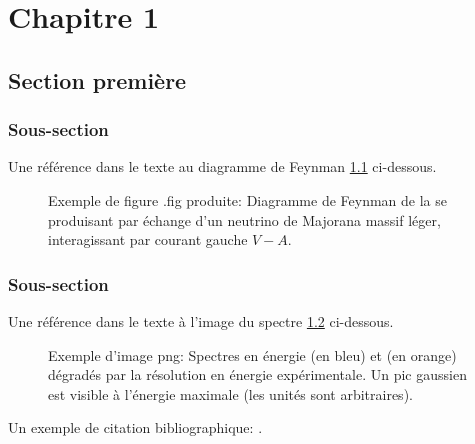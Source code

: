 
\chapter{Chapitre 1} \label{chap1:titre}
\section{Section première}

\subsection{Sous-section}
Une référence dans le texte au diagramme de Feynman \ref{chap1:fig:feynman_0nu} ci-dessous.
\begin{figure}[ht!]
  \centering
  \scalebox{0.50}{}
  \caption{Exemple de figure .fig produite: Diagramme  de  Feynman de  la  \ddbsn{}  se produisant  par échange  d'un neutrino  de  Majorana massif  léger, interagissant  par courant gauche $V-A$.}
  \label{chap1:fig:feynman_0nu}
\end{figure}

\subsection{Sous-section}
Une référence dans le texte à l'image du spectre \ref{chap1:fig:dbd_spectre} ci-dessous.

\begin{figure}[ht!]
  \centering
  \caption{Exemple d'image png: Spectres  en énergie  \BBDN{}  (en bleu)  et \BBZN{}  (en orange) dégradés  par la résolution  en énergie expérimentale.   Un pic gaussien  est visible  à l'énergie  maximale \QBB{}  (les unités  sont
arbitraires).}
  \label{chap1:fig:dbd_spectre}
\end{figure}

\pagebreak
Un exemple de citation bibliographique: \cite{chap1_pauli_letter}.
